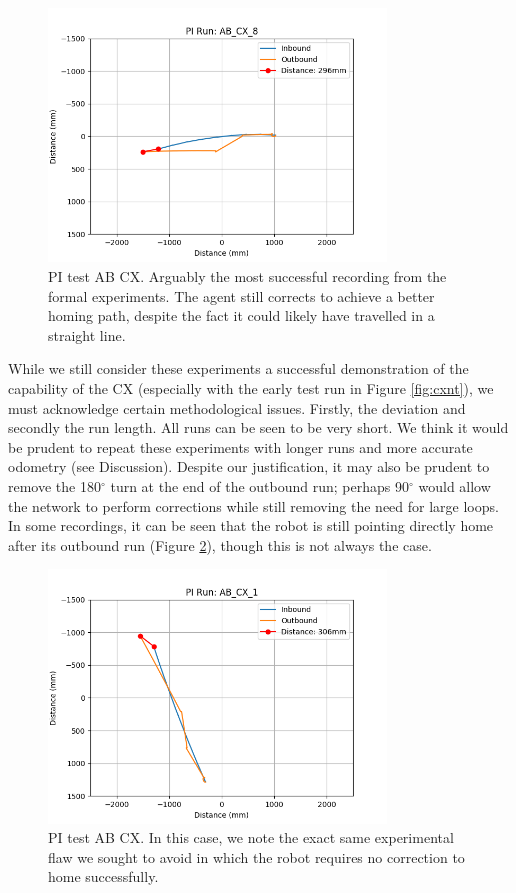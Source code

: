 \documentclass[a4paper,11pt,twoside,openright]{article}
\begin{document}
\begin{figure}[h!]
  \centering
  \includegraphics[width=0.8\textwidth]{AB_CX_8}
  \caption{\label{fig:abcx8i} PI test AB\textunderscore
    CX. Arguably the most successful recording from
    the formal experiments. The agent still corrects to achieve a
    better homing path, despite the fact it could likely have
    travelled in a straight line. }
\end{figure}

While we still consider these experiments a successful demonstration
of the capability of the CX (especially with the early test run in
Figure \ref{fig:cxnt}), we must acknowledge certain methodological
issues. Firstly, the deviation and secondly the run length. All runs
can be seen to be very short. We think it would be prudent to repeat
these experiments with longer runs and more accurate odometry (see
Discussion). Despite our justification, it may also be prudent to
remove the 180$^{\circ}$ turn at the end of the outbound run; perhaps
90$^\circ$ would allow the network to perform corrections while still
removing the need for large loops. In some
recordings, it can be seen that the robot is still pointing directly
home after its outbound run (Figure \ref{fig:abcx1i}), though this is
not always the case.

\begin{figure}[h!]
  \centering
  \includegraphics[width=0.8\textwidth]{AB_CX_1}
  \caption{\label{fig:abcx1i} PI test AB\textunderscore
    CX. In this case, we note the exact same
    experimental flaw we sought to avoid in which the robot requires
    no correction to home successfully.}
\end{figure}
\end{document}
